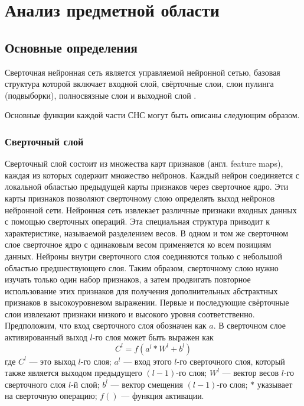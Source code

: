 \chapter{Анализ предметной области}

\section{Основные определения}
 Сверточная нейронная сеть является управляемой нейронной сетью, базовая структура которой включает входной слой, свёрточные слои, слои пулинга (подвыборки), полносвязные слои и выходной слой \cite{recursive}.
 
 
Основные функции каждой части СНС могут быть описаны следующим образом.
\subsection{Сверточный слой}
	Сверточный слой состоит из множества карт признаков (англ. feature maps), каждая из которых содержит множество нейронов. Каждый нейрон соединяется с локальной областью предыдущей карты признаков через сверточное ядро. Эти карты признаков позволяют сверточному слою определять выход нейронов нейронной сети. Нейронная сеть извлекает различные признаки входных данных с помощью сверточных операций. Эта специальная структура приводит к характеристике, называемой разделением весов. В одном и том же сверточном слое сверточное ядро с одинаковым весом применяется ко всем позициям данных. Нейроны внутри сверточного слоя соединяются только с небольшой областью предшествующего слоя. Таким образом, сверточному слою нужно изучать только один набор признаков, а затем продвигать повторное использование этих признаков для получения дополнительных абстрактных признаков в высокоуровневом выражении.
	Первые и последующие свёрточные слои извлекают признаки низкого и высокого уровня соответственно. Предположим, что вход сверточного слоя обозначен как \( a \). В сверточном слое активированный выход \( l \)-го слоя может быть выражен как
	\begin{equation}
		C^{l} = f(a^{l} \ast W^{l} + b^{l})
	\end{equation}
	где \( C^{l} \) --- это выход \( l \)-го слоя; \( a^{l} \) --- вход этого \( l \)-го сверточного слоя, который также является выходом предыдущего \( (l - 1) \)-го слоя; \( W^{l} \) --- вектор весов \( l \)-го сверточного слоя \( l \)-й слой; \( b^{l} \) --- вектор смещения \( (l - 1) \)-го слоя; \(\ast\) указывает на сверточную операцию; \( f() \) --- функция активации.
